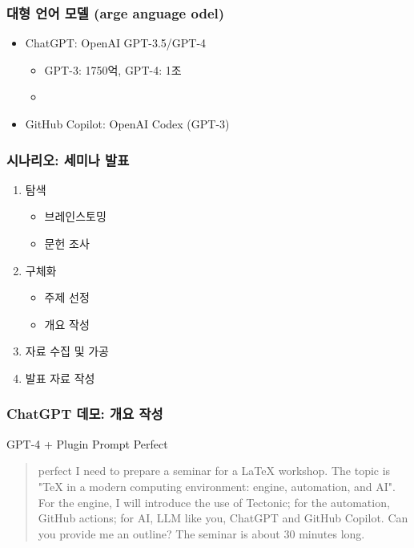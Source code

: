 \begin{frame}
  \frametitle{대형 언어 모델 (arge anguage odel)}

  \begin{itemize}
    \item ChatGPT: OpenAI GPT-3.5/GPT-4
      \begin{itemize}
        \item GPT-3: 1750억, GPT-4: 1조
        \item {}
      \end{itemize}
    \item GitHub Copilot: OpenAI Codex (GPT-3)
  \end{itemize}
\end{frame}

\begin{frame}
  \frametitle{시나리오: 세미나 발표}

  \begin{enumerate}
    \item<1-> 탐색
      \begin{itemize}
        \item 브레인스토밍
        \item 문헌 조사
      \end{itemize}

    \item<2-> 구체화
      \begin{itemize}
        \item 주제 선정
        \item 개요 작성
      \end{itemize}

    \item<3-> 자료 수집 및 가공

    \item<4-> 발표 자료 작성
  \end{enumerate}
\end{frame}

\begin{frame}[c]
  \frametitle{ChatGPT 데모: 개요 작성}

  GPT-4 + Plugin Prompt Perfect

  \begin{quotation}
    perfect I need to prepare a seminar for a LaTeX workshop. The topic is "TeX in a modern computing environment: engine, automation, and AI". For the engine, I will introduce the use of Tectonic; for the automation, GitHub actions; for AI, LLM like you, ChatGPT and GitHub Copilot. Can you provide me an outline? The seminar is about 30 minutes long.
  \end{quotation}
\end{frame}

